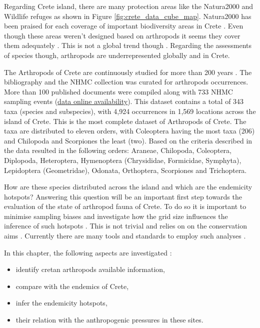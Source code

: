 Regarding Crete island, there are many protection areas like the 
Natura2000 and Wildlife refuges as shown in Figure \ref{fig:crete_data_cube_map}.
Natura2000 has been praised for each coverage of important biodiversity areas in 
Crete \parencite{spiliopoulou2021the-natura,kougioumoutzis2021plant}. Even though 
these areas weren't designed based on arthropods it seems they cover them 
adequately \parencite{bolanakis2024}. This is not a global trend though \parencite{chowdhury2023three-quarters}.
Regarding the
assessments of species though, arthropods are underrepresented globally and in Crete.

The Arthropods of Crete are continuously studied for more than 200 years \parencite{Anastasiou2018Tenebrionid}.
The bibliography and the NHMC collection was curated for arthropods occurrences.
More than 100 published documents were compiled along with 733 NHMC sampling events
(\href{https://doi.org/10.5281/zenodo.10635645}{data online availability}).
This dataset contains a total of 343 taxa (species and subspecies),
with 4,924 occurrences in 1,569 locations across the island of Crete. This is the most
complete dataset of Arthropods of Crete.
The taxa are distributed to eleven orders, with Coleoptera having the most taxa (206)
and Chilopoda and Scorpiones the least (two).
Based on the criteria described in \textcite{bolanakis2024} the data resulted in the
following orders:
Araneae, Chilopoda, Coleoptera, Diplopoda, Heteroptera, Hymenoptera (Chrysididae, Formicidae, Symphyta), Lepidoptera (Geometridae), Odonata, Orthoptera, Scorpiones and Trichoptera.

How are these species distributed across the island and which are the endemicity hotspots?
Answering this question will be an important first step towards the evaluation of the 
state of arthropod fauna of Crete. To do so it is important to minimise sampling biases and investigate how
the grid size influences the inference of such hotspots \parencite{hurlbert2007species,nhancale2011the-influence}.
This is not trivial \parencite{mo2019influences} and relies on
on the conservation aims \parencite{margules2000systematic}.
Currently there are many tools and standards to employ such analyses \parencite{bongaarts2019ipbes}.

In this chapter, the following aspects are investigated :
\begin{itemize}
    \item identify cretan arthropods available information,
    \item compare with the endemics of Crete,
    \item infer the endemicity hotspots,
    \item their relation with the anthropogenic pressures in these sites.
\end{itemize}

